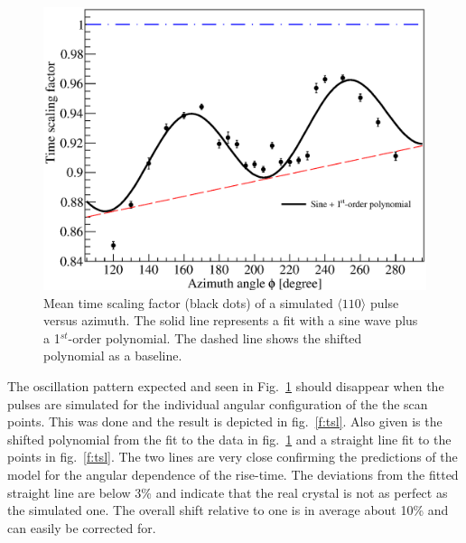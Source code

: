 \documentclass[epj]{svjour}
\begin{document}
\begin{figure}
\includegraphics[width=\linewidth]{tsc}
\caption{Mean time scaling factor (black dots) of a simulated $\langle
110 \rangle$ pulse versus azimuth. The solid line represents a fit
with a sine wave plus a 1$^{st}$-order polynomial. The dashed line
shows the shifted polynomial as a baseline.}
\label{f:tsc}
\end{figure}

The oscillation pattern expected and seen in Fig.~\ref{f:tsc} should
disappear when the pulses are simulated for the individual angular
configuration of the the scan points. This was done and the result is
depicted in fig.~\ref{f:tsl}. Also given is the shifted polynomial
from the fit to the data in fig.~\ref{f:tsc} and a straight line fit
to the points in fig.~\ref{f:tsl}. The two lines are very close
confirming the predictions of the model for the angular dependence of
the rise-time. The deviations from the fitted straight line are below
3\% and indicate that the real crystal is not as perfect as the
simulated one. The overall shift relative to one is in average about
10\% and can easily be corrected for.
\end{document}
